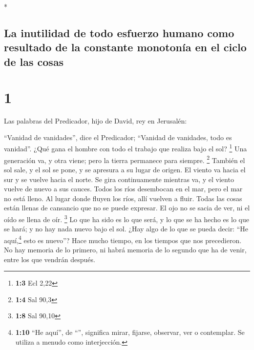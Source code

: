 \begin{paracol}{2} \switchcolumn[0]*

\hypertarget{la-inutilidad-de-todo-esfuerzo-humano-como-resultado-de-la-constante-monotonuxeda-en-el-ciclo-de-las-cosas}{%
\subsection{La inutilidad de todo esfuerzo humano como resultado de la
constante monotonía en el ciclo de las
cosas}\label{la-inutilidad-de-todo-esfuerzo-humano-como-resultado-de-la-constante-monotonuxeda-en-el-ciclo-de-las-cosas}}

\hypertarget{section}{%
\section{1}\label{section}}

 Las palabras del Predicador, hijo de David, rey en
Jerusalén:

 ``Vanidad de vanidades'', dice el Predicador; ``Vanidad
de vanidades, todo es vanidad''.  ¿Qué gana el hombre con
todo el trabajo que realiza bajo el sol? \footnote{\textbf{1:3} Ecl 2,22}
 Una generación va, y otra viene; pero la tierra permanece
para siempre. \footnote{\textbf{1:4} Sal 90,3}  También el
sol sale, y el sol se pone, y se apresura a su lugar de origen.
 El viento va hacia el sur y se vuelve hacia el norte. Se
gira continuamente mientras va, y el viento vuelve de nuevo a sus
cauces.  Todos los ríos desembocan en el mar, pero el mar
no está lleno. Al lugar donde fluyen los ríos, allí vuelven a fluir.
 Todas las cosas están llenas de cansancio que no se puede
expresar. El ojo no se sacia de ver, ni el oído se llena de oír.
\footnote{\textbf{1:8} Sal 90,10}  Lo que ha sido es lo
que será, y lo que se ha hecho es lo que se hará; y no hay nada nuevo
bajo el sol.  ¿Hay algo de lo que se pueda decir: ``He
aquí,\footnote{\textbf{1:10} ``He aquí'', de ``'', significa
  mirar, fijarse, observar, ver o contemplar. Se utiliza a menudo como
  interjección.} esto es nuevo''? Hace mucho tiempo, en los tiempos que
nos precedieron.  No hay memoria de lo primero, ni habrá
memoria de lo segundo que ha de venir, entre los que vendrán después.

\hypertarget{la-inutilidad-de-luchar-por-la-sabiduruxeda-y-el-conocimiento-la-vida-humana-resulta-inuxfatil-para-el-espectador}{%
}
\end{paracol}
